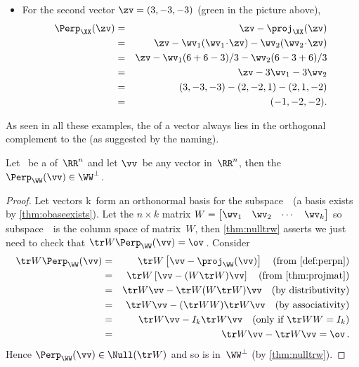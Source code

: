 \begin{reduce}
\begin{example}
\begin{enumerate}[ref=\ref{eg:perpn}(\alph*)]
\begin{solution}
\begin{itemize}
\item For the second vector \(\zv=(3,-3,-3)\) (green in the picture above),
\begin{eqnarray*}
\Perp_\XX(\zv)
&=&\zv-\proj_\XX(\zv)
\\&=&\zv-\wv_1(\wv_1\cdot\zv)-\wv_2(\wv_2\cdot\zv)
\\&=&\zv-\wv_1(6+6-3)/3-\wv_2(6-3+6)/3
\\&=&\zv-3\wv_1-3\wv_2
\\&=&(3,-3,-3)-(2,-2,1)-(2,1,-2)
\\&=&(-1,-2,-2).
\end{eqnarray*}
\end{itemize}
\end{solution}

\end{enumerate}
\end{example}


As seen in all these examples, the  of a vector always lies in the orthogonal complement to the   (as suggested by the naming).


\begin{theorem} \label{thm:perpn}
Let \WW\ be a  of~\(\RR^n\) and let \(\vv\)~be any vector in~\(\RR^n\), then the  \(\Perp_\WW(\vv)\in\WW^\perp\).
\end{theorem}

\begin{proof} 
Let vectors \hlist\wv k\ form an orthonormal basis for the subspace~\WW\ (a basis exists by \autoref{thm:obaseexists}).
Let the \(n\times k\) matrix \(W=\begin{bmatrix} \wv_1&\wv_2&\cdots&\wv_k \end{bmatrix}\) so subspace~\WW\ is the column space of matrix~\(W\), then \autoref{thm:nulltrw} asserts we just need to check that \(\tr W\Perp_\WW(\vv)=\ov\)\,.
Consider 
\begin{eqnarray*}
\tr W\Perp_\WW(\vv)
&=&\tr W\left[\vv-\proj_\WW(\vv)\right]
\quad(\text{from \autoref{def:perpn}})
\\&=&\tr W\left[\vv-(W\tr W)\vv\right]
\quad(\text{from \autoref{thm:projmat}})
\\&=&\tr W\vv-\tr W(W\tr W)\vv
\quad(\text{by distributivity})
\\&=&\tr W\vv-(\tr WW)\tr W\vv 
\quad(\text{by associativity})
\\&=&\tr W\vv-I_k\tr W\vv 
\quad(\text{only if }\tr WW=I_k)
\\&=&\tr W\vv-\tr W\vv =\ov\,.
\end{eqnarray*}
Hence \(\Perp_\WW(\vv)\in\Null(\tr W)\) and so is in~\(\WW^\perp\) (by \autoref{thm:nulltrw}).


\end{proof}
\end{reduce}
